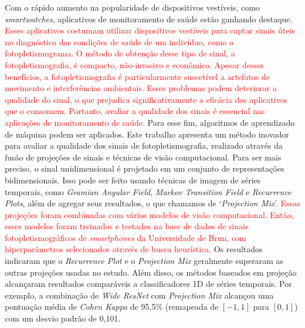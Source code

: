 Com o rápido aumento na popularidade de dispositivos vestíveis, como \textit{smartwatches}, aplicativos de monitoramento de saúde estão ganhando destaque. \textcolor{red}{Esses aplicativos costumam utilizar dispositivos vestíveis para captar sinais úteis no diagnóstico das condições de saúde de um indivíduo, como o fotopletismograma. O método de obtenção desse tipo de sinal, a fotopletismografia, é compacto, não-invasivo e econômico. Apesar desses benefícios, a fotopletismografia é particularmente suscetível a artefatos de movimento e interferências ambientais. Esses problemas podem deteriorar a qualidade do sinal, o que prejudica significativamente a eficácia dos aplicativos que o consomem. Portanto, avaliar a qualidade dos sinais é essencial nas aplicações de monitoramento de saúde.}
Para esse fim, algoritmos de aprendizado de máquina podem ser aplicados. Este trabalho apresenta um método inovador para avaliar a qualidade dos sinais de fotopletismografia, realizado através da fusão de projeções de sinais e técnicas de visão computacional. Para ser mais preciso, o sinal unidimensional é projetado em um conjunto de representações bidimensionais. Isso pode ser feito usando técnicas de imagem de séries temporais, como \textit{Gramian Angular Field}, \textit{Markov Transition Field} e \textit{Recurrence Plots}, além de agregar seus resultados, o que chamamos de `\textit{Projection Mix}'. \textcolor{red}{Essas projeções foram combinadas com vários modelos de visão computacional. Então, esses modelos foram treinados e testados na base de dados de sinais fotopletismográficos de \textit{smartphones} da Universidade de Brun, com hiperparâmetros selecionados através de busca heurística.} Os resultados indicaram que o \textit{Recurrence Plot} e o \textit{Projection Mix} geralmente superaram as outras projeções usadas no estudo. Além disso, os métodos baseados em projeção alcançaram resultados comparáveis a classificadores 1D de séries temporais. Por exemplo, a combinação de \textit{Wide ResNet} com \textit{Projection Mix} alcançou uma pontuação média de \textit{Cohen Kappa} de 95,5\% (remapeada de $[-1,1]$ para $[0,1]$) com um desvio padrão de 0,101. 
